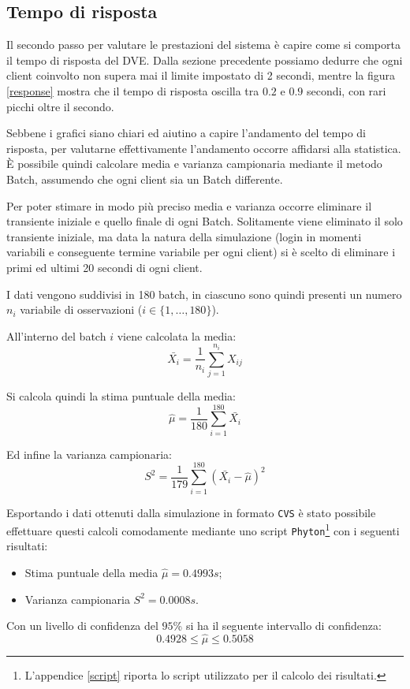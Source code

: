 \documentclass[a4paper, 11pt, oneside]{book}
\theoremstyle{definition}
\theoremstyle{remark}
\begin{document}
\subsection{Tempo di risposta}
Il secondo passo per valutare le prestazioni del sistema è capire come si
comporta il tempo di risposta del DVE. Dalla sezione precedente possiamo
dedurre che ogni client coinvolto non supera mai il limite impostato di 2
secondi, mentre la figura \ref{response} mostra che il tempo di risposta
oscilla tra $0.2$ e $0.9$ secondi, con rari picchi oltre il secondo.

Sebbene i grafici siano chiari ed aiutino a capire l'andamento del tempo
di risposta, per valutarne effettivamente l'andamento occorre affidarsi alla
statistica. \`E possibile quindi calcolare media e varianza campionaria
mediante il metodo Batch, assumendo che ogni client sia un Batch differente.

Per poter stimare in modo più preciso media e varianza occorre eliminare
il transiente iniziale e quello finale di ogni Batch. Solitamente viene
eliminato il solo transiente iniziale, ma data la natura della simulazione
(login in momenti variabili e conseguente termine variabile per ogni client)
si è scelto di eliminare i primi ed ultimi 20 secondi di ogni client.

I dati vengono suddivisi in 180 batch, in ciascuno sono quindi presenti un
numero $n_i$ variabile di osservazioni ($i \in \{1, \ldots, 180\}$).

All'interno del batch $i$ viene calcolata la media:
\[
\bar{X_i} = \frac{1}{n_i} \sum_{j=1}^{n_i} X_{ij}
\]

Si calcola quindi la stima puntuale della media:
\[
\hat{\mu} = \frac{1}{180}\sum_{i=1}^{180}\bar{X_i}
\]

Ed infine la varianza campionaria:
\[
S^2 = \frac{1}{179} \sum_{i=1}^{180}\left( \bar{X_i} - \hat{\mu}\right)^2
\]

Esportando i dati ottenuti dalla simulazione in formato \texttt{CVS} è stato
possibile effettuare questi calcoli comodamente mediante uno script
\texttt{Phyton}\footnote{L'appendice \ref{script} riporta lo script utilizzato
per il calcolo dei risultati.}
con i seguenti risultati:
\begin{itemize}
\item
Stima puntuale della media $\hat{\mu} = 0.4993s$;
\item
Varianza campionaria $S^2 = 0.0008s$.
\end{itemize}
Con un livello di confidenza del $95$\% si ha il seguente intervallo di
confidenza:
\[
0.4928 \le \hat{\mu} \le 0.5058
\]
\end{document}
